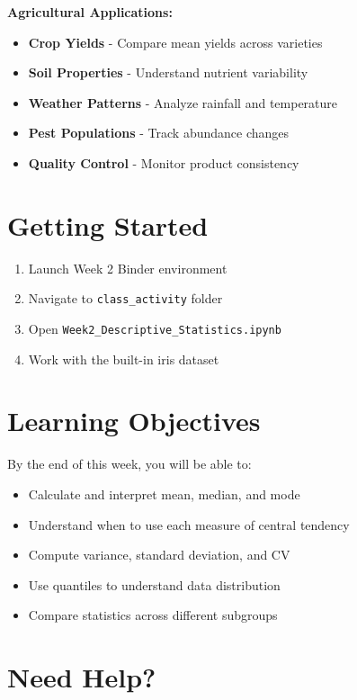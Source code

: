 \documentclass[11pt,a4paper]{article}
\begin{document}
\begin{infobox}
\textbf{Agricultural Applications:}
\begin{itemize}
    \item \textbf{Crop Yields} - Compare mean yields across varieties
    \item \textbf{Soil Properties} - Understand nutrient variability
    \item \textbf{Weather Patterns} - Analyze rainfall and temperature
    \item \textbf{Pest Populations} - Track abundance changes
    \item \textbf{Quality Control} - Monitor product consistency
\end{itemize}
\end{infobox}

\section{Getting Started}

\begin{enumerate}
    \item Launch Week 2 Binder environment
    \item Navigate to \texttt{class\_activity} folder
    \item Open \texttt{Week2\_Descriptive\_Statistics.ipynb}
    \item Work with the built-in iris dataset
\end{enumerate}

\section{Learning Objectives}

By the end of this week, you will be able to:
\begin{itemize}
    \item Calculate and interpret mean, median, and mode
    \item Understand when to use each measure of central tendency
    \item Compute variance, standard deviation, and CV
    \item Use quantiles to understand data distribution
    \item Compare statistics across different subgroups
\end{itemize}

\section{Need Help?}
\end{document}
